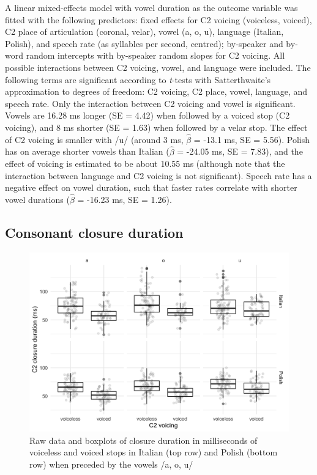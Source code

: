 \documentclass[charis]{glossa}
\begin{document}
A linear mixed-effects model with vowel duration as the outcome variable
was fitted with the following predictors: fixed effects for C2 voicing
(voiceless, voiced), C2 place of articulation (coronal, velar), vowel
(a, o, u), language (Italian, Polish), and speech rate (as syllables per
second, centred); by-speaker and by-word random intercepts with
by-speaker random slopes for C2 voicing. All possible interactions
between C2 voicing, vowel, and language were included. The following
terms are significant according to \emph{t}-tests with Satterthwaite's
approximation to degrees of freedom: C2 voicing, C2 place, vowel,
language, and speech rate. Only the interaction between C2 voicing and
vowel is significant. Vowels are 16.28 ms longer (SE = 4.42) when
followed by a voiced stop (C2 voicing), and 8 ms shorter (SE = 1.63)
when followed by a velar stop. The effect of C2 voicing is smaller with
/u/ (around 3 ms, \(\hat{\beta}\) = -13.1 ms, SE = 5.56). Polish has on
average shorter vowels than Italian (\(\hat{\beta}\) = -24.05 ms, SE =
7.83), and the effect of voicing is estimated to be about 10.55 ms
(although note that the interaction between language and C2 voicing is
not significant). Speech rate has a negative effect on vowel duration,
such that faster rates correlate with shorter vowel durations
(\(\hat{\beta}\) = -16.23 ms, SE = 1.26).

\hypertarget{consonant-closure-duration}{%
\subsection{Consonant closure
duration}\label{consonant-closure-duration}}

\label{s:cduration}

\begin{figure}
\includegraphics[width=\linewidth]{./Figure3-1} \caption{Raw data and boxplots of closure duration in milliseconds of voiceless and voiced stops in Italian (top row) and Polish (bottom row) when preceded by the vowels /a, o, u/}\label{f:Figure3}
\end{figure}
\end{document}
